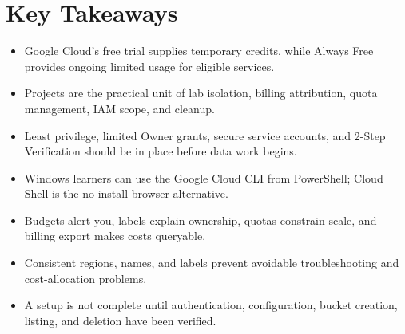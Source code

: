\section*{Key Takeaways}
\begin{itemize}
    \item Google Cloud's free trial supplies temporary credits, while Always Free provides ongoing limited usage for eligible services.
    \item Projects are the practical unit of lab isolation, billing attribution, quota management, IAM scope, and cleanup.
    \item Least privilege, limited Owner grants, secure service accounts, and 2-Step Verification should be in place before data work begins.
    \item Windows learners can use the Google Cloud CLI from PowerShell; Cloud Shell is the no-install browser alternative.
    \item Budgets alert you, labels explain ownership, quotas constrain scale, and billing export makes costs queryable.
    \item Consistent regions, names, and labels prevent avoidable troubleshooting and cost-allocation problems.
    \item A setup is not complete until authentication, configuration, bucket creation, listing, and deletion have been verified.
\end{itemize}

